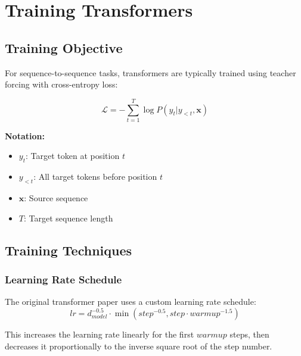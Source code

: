
\section{Training Transformers}

\subsection{Training Objective}

For sequence-to-sequence tasks, transformers are typically trained using teacher forcing with cross-entropy loss:

\begin{equation}
\mathcal{L} = -\sum_{t=1}^{T} \log P(y_t | y_{<t}, \mathbf{x})
\end{equation}
\begin{notationbox}
\textbf{Notation:}
\begin{itemize}
    \item $y_t$: Target token at position $t$
    \item $y_{<t}$: All target tokens before position $t$
    \item $\mathbf{x}$: Source sequence
    \item $T$: Target sequence length
\end{itemize}
\end{notationbox}

\subsection{Training Techniques}

\subsubsection{Learning Rate Schedule}

The original transformer paper uses a custom learning rate schedule:
\begin{equation}
lr = d_{model}^{-0.5} \cdot \min(step^{-0.5}, step \cdot warmup^{-1.5})
\end{equation}

This increases the learning rate linearly for the first $warmup$ steps, then decreases it proportionally to the inverse square root of the step number.

